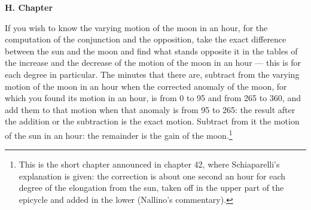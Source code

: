 \documentclass[11pt]{article}
\newcommand{\SectionHead}[4]{\par\needspace{6\baselineskip}\medskip\pdfbookmark[2]{#1}{sec-#2}\hypertarget{EN-S#2}{}%
 {\bfseries\interlinepenalty=10000 #1#4{\normalfont#3}\par}\nobreak\smallskip}
\begin{document}
\SectionHead{H. Chapter}{57H}{}{}
\par If you wish to know the varying motion of the moon in an hour, for the computation of the conjunction and the opposition, take the exact difference between the sun and the moon and find what stands opposite it in the tables of the increase and the decrease of the motion of the moon in an hour — this is for each degree in particular. The minutes that there are, subtract from the varying motion of the moon in an hour when the corrected anomaly of the moon, for which you found its motion in an hour, is from 0 to 95 and from 265 to 360, and add them to that motion when that anomaly is from 95 to 265: the result after the addition or the subtraction is the exact motion. Subtract from it the motion of the sun in an hour: the remainder is the gain of the moon.\footnote{This is the short chapter announced in chapter 42, where Schiaparelli's explanation is given: the correction is about one second an hour for each degree of the elongation from the sun, taken off in the upper part of the epicycle and added in the lower (Nallino's commentary).}\par

\end{document}
